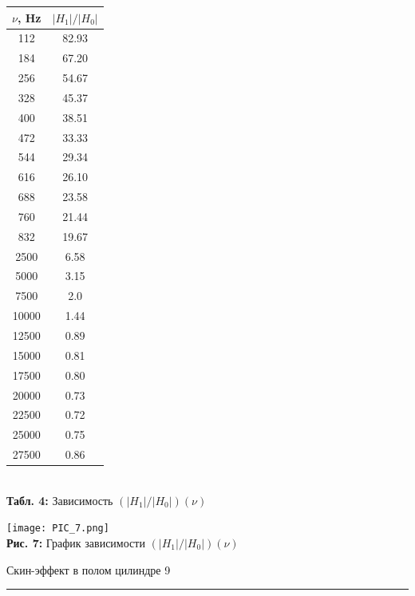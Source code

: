 \documentclass[12pt,a4paper]{scrartcl}
\begin{document}
	\begin{center}
		\begin{tabular}{|c|c|}
			\hline
			$\nu$, Hz & $|H_1|/|H_0|$
			\\\hline
			112 & 82.93
			\\\hline
			184 & 67.20
			\\\hline
			256 & 54.67
			\\\hline
			328 & 45.37
			\\\hline
			400 & 38.51
			\\\hline
			472 & 33.33
			\\\hline
			544 & 29.34
			\\\hline
			616 & 26.10
			\\\hline
			688 & 23.58
			\\\hline
			760 & 21.44
			\\\hline
			832 & 19.67
			\\\hline
			2500 & 6.58
			\\\hline
			5000 & 3.15
			\\\hline
			7500 & 2.0
			\\\hline
			10000 & 1.44
			\\\hline
			12500 & 0.89
			\\\hline
			15000 & 0.81
			\\\hline
			17500 & 0.80
			\\\hline
			20000 & 0.73
			\\\hline
			22500 & 0.72
			\\\hline
			25000 & 0.75
			\\\hline
			27500 & 0.86
			\\\hline
		\end{tabular}
		\\\textbf{Табл. 4:} Зависимость $(|H_1|/|H_0|)(\nu)$
	\end{center}

	\begin{center}
		\texttt{[image: PIC\_7.png]}
		\\\textbf{Рис. 7:} График зависимости $(|H_1|/|H_0|)(\nu)$
	\end{center}
	
	
	\newpage
	
	\begin{flushleft}
		\footnotesize{Скин-эффект в полом цилиндре} \hspace{\fill} \footnotesize{9}
		\\[-0.3cm]\noindent\rule{\textwidth}{0.3pt}
	\end{flushleft}
	
\end{document}

